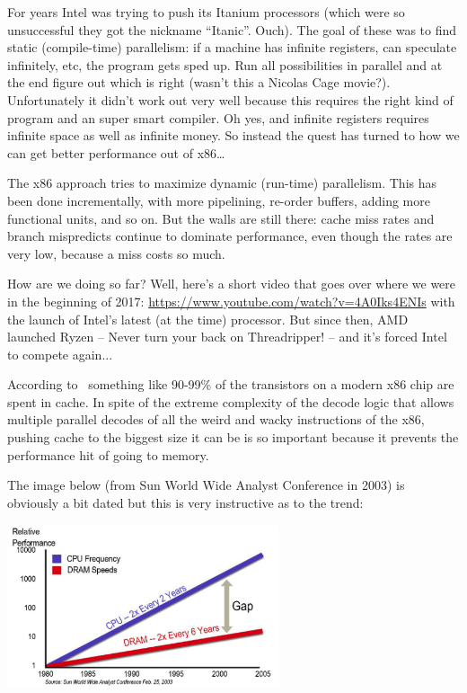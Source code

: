 For years Intel was trying to push its Itanium processors (which were so unsuccessful they got the nickname ``Itanic''. Ouch). The goal of these was to find static (compile-time) parallelism: if a machine has infinite registers, can speculate infinitely, etc, the program gets sped up. Run all possibilities in parallel and at the end figure out which is right (wasn't this a Nicolas Cage movie?). Unfortunately it didn't work out very well because this requires the right kind of program and an super smart compiler. Oh yes, and infinite registers requires infinite space as well as infinite money. So instead the quest has turned to how we can get better performance out of x86\ldots

The x86 approach tries to maximize dynamic (run-time) parallelism. This has been done incrementally, with more pipelining, re-order buffers, adding more functional units, and so on. But the walls are still there: cache miss rates and branch mispredicts continue to dominate performance, even though the rates are very low, because a miss costs so much. 

How are we doing so far? Well, here's a short video that goes over where we were in the beginning of 2017: \url{https://www.youtube.com/watch?v=4A0Iks4ENIs} with the launch of Intel's latest (at the time) processor. But since then, AMD launched Ryzen -- Never turn your back on Threadripper! -- and it's forced Intel to compete again... 

According to~\cite{modern-hardware} something like 90-99\% of the transistors on a modern x86 chip are spent in cache. In spite of the extreme complexity of the decode logic that allows multiple parallel decodes of all the weird and wacky instructions of the x86, pushing cache to the biggest size it can be is so important because it prevents the performance hit of going to memory.

The image below (from Sun World Wide Analyst Conference in 2003) is obviously a bit dated but this is very instructive as to the trend:
\begin{center}
\includegraphics[width=0.6\textwidth]{images/ram-vs-cpu.png}
\end{center}

